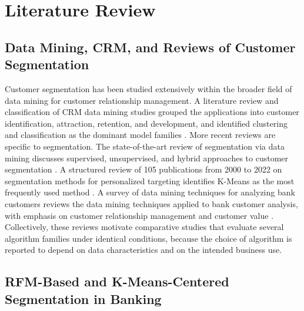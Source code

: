 \documentclass[conference]{IEEEtran}
\begin{document}
\section{Literature Review}
\label{sec:literature}

\subsection{Data Mining, CRM, and Reviews of Customer Segmentation}

Customer segmentation has been studied extensively within the broader field of data mining for customer relationship management. A literature review and classification of CRM data mining studies grouped the applications into customer identification, attraction, retention, and development, and identified clustering and classification as the dominant model families \cite{ngai2011application}. More recent reviews are specific to segmentation. The state-of-the-art review of segmentation via data mining discusses supervised, unsupervised, and hybrid approaches to customer segmentation \cite{das2022}. A structured review of 105 publications from 2000 to 2022 on segmentation methods for personalized targeting identifies K-Means as the most frequently used method \cite{gomes2023}. A survey of data mining techniques for analyzing bank customers reviews the data mining techniques applied to bank customer analysis, with emphasis on customer relationship management and customer value \cite{hasheminejad2018}. Collectively, these reviews motivate comparative studies that evaluate several algorithm families under identical conditions, because the choice of algorithm is reported to depend on data characteristics and on the intended business use.

\subsection{RFM-Based and K-Means-Centered Segmentation in Banking}
\end{document}
